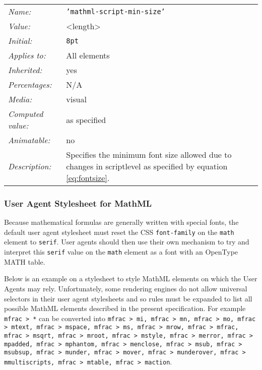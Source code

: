 \begin{table}
\begin{tabular}{ll}
  \emph{Name:} & {\tt 'mathml-script-min-size'} \\
  \emph{Value:} & \textless length\textgreater \\
  \emph{Initial:} & {\tt 8pt} \\
  \emph{Applies to:} & All elements \\
  \emph{Inherited:} & yes \\
  \emph{Percentages:} & N/A \\
  \emph{Media:} & visual \\
  \emph{Computed value:} & as specified \\
  \emph{Animatable:} & no \\
  \emph{Description:} & Specifies the minimum font size allowed due to changes
  in scriptlevel as specified by equation \ref{eq:fontsize}.
\end{tabular}
\label{tab:CSSScriptSizeMinSize}
\end{table}

\subsubsection{User Agent Stylesheet for MathML}\label{UAStylesheet}

Because mathematical formulas are generally written with special fonts, the
default user agent stylesheet must reset the CSS {\tt font-family} on the
{\tt math} element to {\tt serif}. User agents should then use their own
mechanism to try and interpret this {\tt serif} value on the {\tt math} element
as a font with an OpenType MATH table.

Below is an example on a stylesheet to style MathML elements on which the
User Agents may rely. Unfortunately, some rendering engines do not allow
universal selectors in their user agent stylesheets and so rules must be
expanded to list all possible MathML elements described in the present
specification. For example {\tt mfrac > *} can be converted into
{\tt mfrac > mi, mfrac > mn, mfrac > mo, mfrac > mtext, mfrac > mspace,
mfrac > ms, mfrac > mrow, mfrac > mfrac, mfrac > msqrt, mfrac > mroot,
mfrac > mstyle, mfrac > merror, mfrac > mpadded, mfrac > mphantom,
mfrac > menclose, mfrac > msub, mfrac > msubsup, mfrac > munder, mfrac > mover,
mfrac > munderover, mfrac > mmultiscripts, mfrac > mtable, mfrac > maction}.

